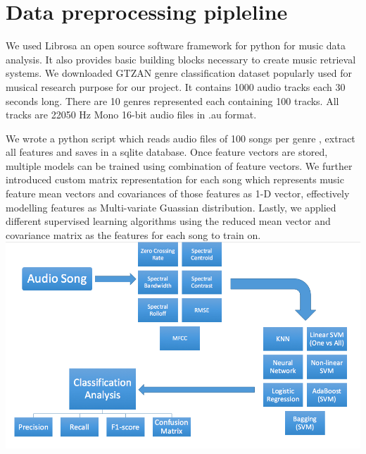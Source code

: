\documentclass[conference]{IEEEtran}
\begin{document}


\section{Data preprocessing pipleline}
\label{sec:Data preprocessing}
We used Librosa an open source software framework for python for music data analysis. It also provides basic building blocks necessary to create music retrieval systems. We downloaded GTZAN genre classification dataset popularly used for musical research purpose for our project. It contains 1000 audio tracks each 30 seconds long. There are 10 genres represented each containing 100 tracks. All tracks are 22050 Hz Mono 16-bit audio files in .au format.

We wrote a python script which reads audio files of 100 songs per genre , extract all features and saves in a sqlite database. Once feature vectors are stored, multiple models
can be trained using combination of feature vectors. We further introduced custom matrix representation for each song which represents music feature mean vectors and covariances
of those features as 1-D vector, effectively modelling features as Multi-variate Guassian distribution. Lastly, we applied different supervised learning algorithms
using the reduced mean vector and covariance matrix as the features for each song to train on.\\

\includegraphics[width=\columnwidth]{pipeline}
\end{document}
